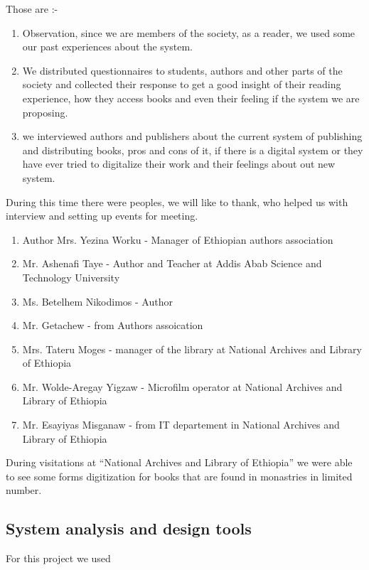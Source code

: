 Those are :-

\begin{enumerate}
\item Observation, since we are members of the society, as a reader, we used some our past experiences about the system.
\item We distributed questionnaires to students, authors and other parts of the society and collected their response to get a good insight of their reading experience, how they access books and even their feeling if the system we are proposing.
\item we interviewed authors and publishers about the current system of publishing and distributing books, pros and cons of it, if there is a digital system or they have ever tried to digitalize their work and their feelings about out new system. 
\end{enumerate}


During this time there were peoples, we will like to thank, who helped us with interview and setting up events for meeting.  

\begin{enumerate}
\item Author Mrs. Yezina Worku - Manager of Ethiopian authors association
\item Mr. Ashenafi Taye - Author and Teacher at Addis Abab Science and Technology University
\item Ms. Betelhem Nikodimos - Author
\item Mr. Getachew - from Authors assoication
\item Mrs. Tateru Moges - manager of the library at National Archives and Library of Ethiopia
\item Mr. Wolde-Aregay Yigzaw - Microfilm operator at National Archives and Library of Ethiopia
\item Mr. Esayiyas Misganaw - from IT departement in National Archives and Library of Ethiopia
\end{enumerate}

During visitations at ``National Archives and Library of Ethiopia'' we were able to see some forms digitization for books that are found in monastries in limited number.

		\subsection{System analysis and design tools}

For this project we used 

